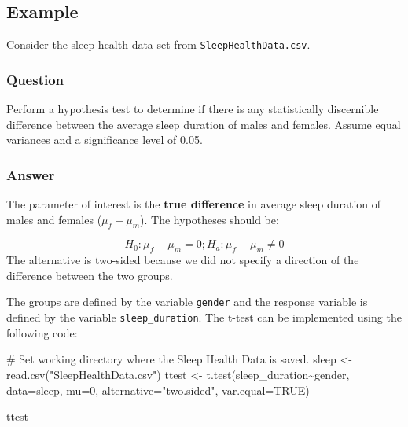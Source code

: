 \documentclass[
  letterpaper,
  DIV=11,
  numbers=noendperiod]{scrartcl}
\newenvironment{Shaded}{\begin{snugshade}}{\end{snugshade}}
\newcommand{\AttributeTok}[1]{\textcolor[rgb]{0.40,0.45,0.13}{#1}}
\newcommand{\CommentTok}[1]{\textcolor[rgb]{0.37,0.37,0.37}{#1}}
\newcommand{\ConstantTok}[1]{\textcolor[rgb]{0.56,0.35,0.01}{#1}}
\newcommand{\DecValTok}[1]{\textcolor[rgb]{0.68,0.00,0.00}{#1}}
\newcommand{\FunctionTok}[1]{\textcolor[rgb]{0.28,0.35,0.67}{#1}}
\newcommand{\NormalTok}[1]{\textcolor[rgb]{0.00,0.23,0.31}{#1}}
\newcommand{\OtherTok}[1]{\textcolor[rgb]{0.00,0.23,0.31}{#1}}
\newcommand{\SpecialCharTok}[1]{\textcolor[rgb]{0.37,0.37,0.37}{#1}}
\newcommand{\StringTok}[1]{\textcolor[rgb]{0.13,0.47,0.30}{#1}}
\begin{document}
\subsection{Example}\label{example-4}

Consider the sleep health data set from \texttt{SleepHealthData.csv}.

\subsubsection{Question}

Perform a hypothesis test to determine if there is any statistically
discernible difference between the average sleep duration of males and
females. Assume equal variances and a significance level of 0.05.

\subsubsection{Answer}

The parameter of interest is the \textbf{true difference} in average
sleep duration of males and females (\(\mu_f-\mu_m\)). The hypotheses
should be:

\[
H_0: \mu_f - \mu_m = 0; H_a: \mu_f - \mu_m \neq 0
\] The alternative is two-sided because we did not specify a direction
of the difference between the two groups.

The groups are defined by the variable \texttt{gender} and the response
variable is defined by the variable \texttt{sleep\_duration}. The t-test
can be implemented using the following code:

\begin{Shaded}
\begin{Highlighting}[]
\CommentTok{\# Set working directory where the Sleep Health Data is saved.}
\NormalTok{sleep }\OtherTok{\textless{}{-}} \FunctionTok{read.csv}\NormalTok{(}\StringTok{"SleepHealthData.csv"}\NormalTok{)}
\NormalTok{ttest }\OtherTok{\textless{}{-}} \FunctionTok{t.test}\NormalTok{(sleep\_duration}\SpecialCharTok{\textasciitilde{}}\NormalTok{gender,}
                \AttributeTok{data=}\NormalTok{sleep,}
                \AttributeTok{mu=}\DecValTok{0}\NormalTok{,}
                \AttributeTok{alternative=}\StringTok{"two.sided"}\NormalTok{,}
                \AttributeTok{var.equal=}\ConstantTok{TRUE}\NormalTok{)}

\NormalTok{ttest}
\end{Highlighting}
\end{Shaded}
\end{document}
